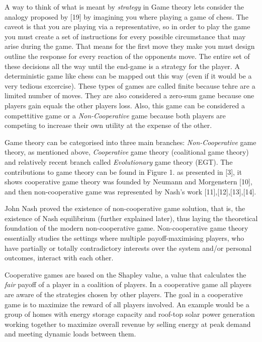 A way to think of what is meant by \textit{strategy} in Game theory lets 
consider the analogy proposed by [19] by imagining you where playing 
a game of chess. The caveot is that you are playing via a representative, 
so in order to play the game you must create a set of instructions for 
every possible circumstance that may arise during the game. That means 
for the first move they make you must design outline the response for 
every reaction of the opponents move. The entire set of these decisions 
all the way until the end-game is a strategy for the player. 
A deterministic game like chess can be mapped out this way (even 
if it would be a very tedious excercise). These types of games are 
called finite because tehre are a limited number of moves. They are 
also considered a zero-sum game because one players gain equals 
the other players loss. Also, this game can be considered a 
compettitive game or a \textit{Non-Cooperative} game because both players 
are competing to increase their own utility at the expense of the other.

Game theory can be categorised into three main branches: \textit{Non-Cooperative} 
game theory, as mentioned above, \textit{Cooperative} game theory (coalitional 
game theory) and relatively recent branch called \textit{Evolutionary} game 
theory (EGT). The contributions to game theory can be found in Figure 1. 
as presented in [3], it shows cooperative game theory was founded by 
Neumann and Morgenstern [10], and then non-cooperative game was represented 
by Nash’s work [11],[12],[13],[14]. 

John Nash proved the existence of non-cooperative game solution, that is,
the existence of Nash equilibrium (further explained later), thus laying
the theoretical foundation of the modern non-cooperative game. Non-cooperative 
game theory essentially studies the settings where multiple payoff-maximising 
players, who have partially or totally contradictory interests over the 
system and/or personal outcomes, interact with each other. 

Cooperative games are based on the Shapley value, a value that calculates 
the \textit{fair} payoff of a player in a coalition of players. In a cooperative 
game all players are aware of the strategies chosen by other players. 
The goal in a cooperative game is to maximize the reward of all players 
involved. An example would be a group of homes with energy storage 
capacity and roof-top solar power generation working together to 
maximize overall revenue by selling energy at peak demand and meeting 
dynamic loads between them. 

